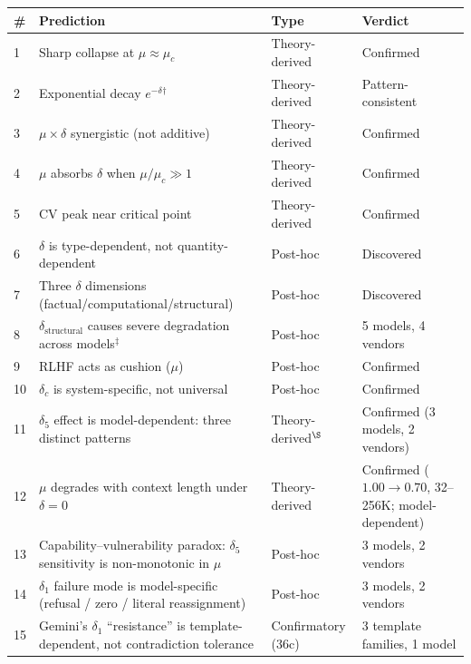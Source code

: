 \documentclass[11pt,a4paper]{article}
\begin{document}
\begin{table}[htbp]
\centering
\small
\begin{tabular}{llll}
\toprule
\textbf{\#} & \textbf{Prediction} & \textbf{Type} & \textbf{Verdict} \\
\midrule
1 & Sharp collapse at $\mu \approx \mu_c$ & Theory-derived & Confirmed \\
2 & Exponential decay $e^{-\delta}$$^\dagger$ & Theory-derived & Pattern-consistent \\
3 & $\mu \times \delta$ synergistic (not additive) & Theory-derived & Confirmed \\
4 & $\mu$ absorbs $\delta$ when $\mu/\mu_c \gg 1$ & Theory-derived & Confirmed \\
5 & CV peak near critical point & Theory-derived & Confirmed \\
\midrule
6 & $\delta$ is type-dependent, not quantity-dependent & Post-hoc & Discovered \\
7 & Three $\delta$ dimensions (factual/computational/structural) & Post-hoc & Discovered \\
8 & $\delta_{\text{structural}}$ causes severe degradation across models$^\ddagger$ & Post-hoc & 5 models, 4 vendors \\
9 & RLHF acts as cushion ($\mu$) & Post-hoc & Confirmed \\
10 & $\delta_c$ is system-specific, not universal & Post-hoc & Confirmed \\
\midrule
11 & $\delta_5$ effect is model-dependent: three distinct patterns & Theory-derived$^\S$ & Confirmed (3 models, 2 vendors) \\
12 & $\mu$ degrades with context length under $\delta = 0$ & Theory-derived & Confirmed ($1.00 \to 0.70$, 32--256K; model-dependent) \\
13 & Capability--vulnerability paradox: $\delta_5$ sensitivity is non-monotonic in $\mu$ & Post-hoc & 3 models, 2 vendors \\
14 & $\delta_1$ failure mode is model-specific (refusal / zero / literal reassignment) & Post-hoc & 3 models, 2 vendors \\
15 & Gemini's $\delta_1$ ``resistance'' is template-dependent, not contradiction tolerance & Confirmatory (36c) & 3 template families, 1 model \\
\bottomrule
\end{tabular}

\end{table}
\end{document}
